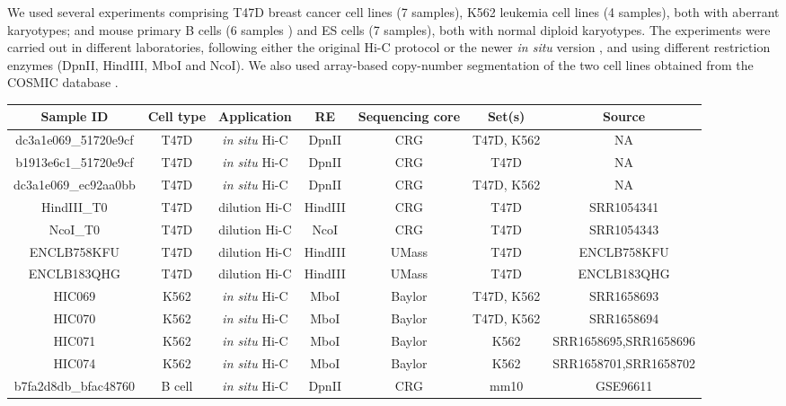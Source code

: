 \documentclass{article}
\begin{document}
We used several experiments comprising T47D breast cancer cell lines (7
samples), K562 leukemia cell lines (4 samples), both with aberrant
karyotypes; and mouse primary B cells (6 samples ) and ES cells (7
samples), both with normal diploid karyotypes. The experiments were
carried out in different laboratories, following either the original Hi-C
protocol \citep{lieberman2009comprehensive} or the newer \textit{in situ}
version \citep{rao20143d}, and using different restriction enzymes (DpnII,
HindIII, MboI and NcoI). We also used array-based copy-number
segmentation of the two cell lines obtained from the COSMIC database
\citep{forbes2010cosmic}.

\begin{landscape}

\begin{table}
\label{tab:samples}
{\begin{tabular}{ccccccc}
  \hline
  \textbf{Sample ID} & \textbf{Cell type} & \textbf{Application} &
  \textbf{RE} & \textbf{Sequencing core} & \textbf{Set(s)} &
  \textbf{Source} \\
  \hline
dc3a1e069\_51720e9cf & T47D & \textit{in situ} Hi-C &
  DpnII & CRG & T47D, K562 & NA \\
b1913e6c1\_51720e9cf & T47D & \textit{in situ} Hi-C &
  DpnII & CRG & T47D & NA \\
dc3a1e069\_ec92aa0bb & T47D & \textit{in situ} Hi-C &
  DpnII & CRG & T47D, K562 & NA \\
HindIII\_T0 & T47D & dilution Hi-C &
  HindIII & CRG & T47D & SRR1054341 \\
NcoI\_T0    & T47D & dilution Hi-C &
  NcoI      & CRG & T47D & SRR1054343 \\
ENCLB758KFU & T47D & dilution Hi-C &
  HindIII   & UMass & T47D & ENCLB758KFU \\
ENCLB183QHG & T47D & dilution Hi-C &
  HindIII   & UMass & T47D & ENCLB183QHG \\
HIC069  & K562 & \textit{in situ} Hi-C &
  MboI & Baylor & T47D, K562 &    SRR1658693 \\
HIC070  & K562 & \textit{in situ} Hi-C &
  MboI & Baylor & T47D, K562 &    SRR1658694 \\
HIC071  & K562 & \textit{in situ} Hi-C &
  MboI & Baylor & K562 & SRR1658695,SRR1658696 \\
HIC074  & K562 & \textit{in situ} Hi-C &
  MboI & Baylor & K562 & SRR1658701,SRR1658702 \\
b7fa2d8db\_bfac48760 & B cell  & \textit{in situ} Hi-C &
  DpnII & CRG & mm10 & GSE96611 \\

\end{tabular}}
\end{table}
\end{landscape}
\end{document}
